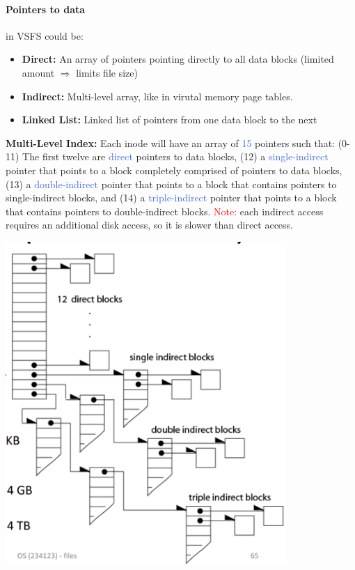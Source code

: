 \documentclass[openany,12pt]{book}
\newcommand{\red}[1]{\textcolor{Red}{#1}}
\newcommand{\blue}[1]{\textcolor{RoyalBlue}{#1}}
\begin{document}
\paragraph{Pointers to data} in VSFS could be:
\begin{itemize}
  \item \textbf{Direct:} An array of pointers pointing directly to all data blocks (limited amount \(\Longrightarrow\) limits file size)

  \item \textbf{Indirect:} Multi-level array, like in virutal memory page tables.

  \item \textbf{Linked List:} Linked list of pointers from one data block to the next
\end{itemize}




\begin{center}
  \begin{minipage}[t]{0.6\textwidth}
    \vspace{0pt} %
    \textbf{Multi-Level Index:} Each inode will have an array of \blue{15} pointers such that: (0-11) The first twelve are \blue{direct} pointers to data blocks, (12) a \blue{single-indirect} pointer that points to a block completely comprised of pointers to data blocks, (13) a \blue{double-indirect} pointer that points to a block that contains pointers to single-indirect blocks, and (14) a \blue{triple-indirect} pointer that points to a block that contains pointers to double-indirect blocks. \red{Note:} each indirect access requires an additional disk access, so it is slower than direct access. 
  \end{minipage}%
  \hspace{1em}
  \begin{minipage}[t]{0.35\textwidth}
    \vspace{0pt} %
    \centering
    \includegraphics[width=0.8\textwidth]{multi-level-index.png}
  \end{minipage}
\end{center}
\end{document}
